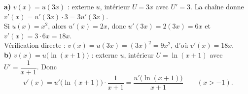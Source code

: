 \begin{corr}
\textbf{a)} $v(x)=u(3x)$ : externe $u$, intérieur $U=3x$ avec $U'=3$. La chaîne donne
$v'(x)=u'(3x)\cdot 3=3u'(3x)$.\\
Si $u(x)=x^2$, alors $u'(x)=2x$, donc $u'(3x)=2(3x)=6x$ et $v'(x)=3\cdot 6x=18x$.\\
Vérification directe : $v(x)=u(3x)=(3x)^2=9x^2$, d'où $v'(x)=18x$. \checkmark\\[2pt]
\textbf{b)} $v(x)=u\big(\ln(x+1)\big)$ : externe $u$, intérieur $U=\ln(x+1)$ avec
$U'=\dfrac{1}{x+1}$. Donc
\[
v'(x)=u'\big(\ln(x+1)\big)\cdot\frac{1}{x+1}=\frac{u'\big(\ln(x+1)\big)}{x+1}\qquad(x>-1).
\]
\end{corr}


